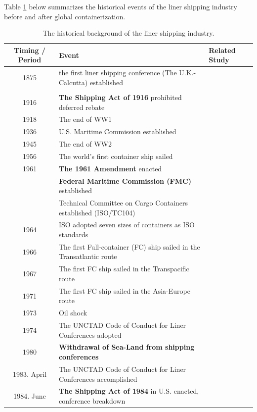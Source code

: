 \documentclass[11pt]{article}
\begin{document}
Table \ref{tb:industry_history} below summarizes the historical events of the liner shipping industry before and after global containerization.
\begin{table}[ht!]
    \caption{The historical background of the liner shipping industry.}
    \label{tb:industry_history}
    \centering\scriptsize{}
    \begin{tabular}{cll}
      Timing / Period & Event & Related Study\\\hline
      1875 & the first liner shipping conference (The U.K.-Calcutta) established & \cite{morton1997entry}\\
       &  & \cite{podolny1999social}\\
      1916 & \textbf{The Shipping Act of 1916} prohibited deferred rebate &\\
      1918 & The end of WW1 & \cite{deltas1999american}\\
      1936 & U.S. Maritime Commission established &\\
      1945 & The end of WW2 & \\
      1956 & The world's first container ship sailed & \\
      1961 & \textbf{The 1961 Amendment} enacted & \\
      & \textbf{Federal Maritime Commission (FMC)} established & \\
      & Technical Committee on Cargo Containers established (ISO/TC104) &\\
      1964 & ISO adopted seven sizes of containers as ISO standards &\\
      \hline
      1966 & The first Full-container (FC) ship sailed in the Transatlantic route &\\
      1967 & The first FC ship sailed in the Transpacific route &\\
      1971 & The first FC ship sailed in the Asia-Europe route& \\
      1973 & Oil shock &\\
      1974 & The UNCTAD Code of Conduct for Liner Conferences adopted &\cite{fox1992empirical,fox1995some}\\
      1980 & \textbf{Withdrawal of Sea-Land from shipping conferences}&\cite{sjostrom1989collusion}\\
      1983. April&The UNCTAD Code of Conduct for Liner Conferences accomplished &\\
      1984. June & \textbf{The Shipping Act of 1984} in U.S. enacted, conference breakdown &\cite{clyde1995effectiveness,clyde1998market}\\

\end{tabular}
\end{table}
\end{document}
